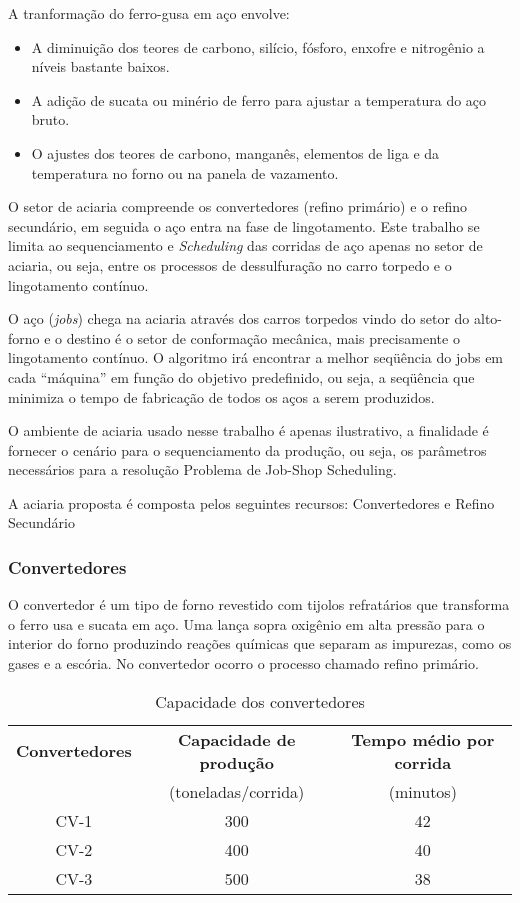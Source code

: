 A tranformação do ferro-gusa em aço envolve:
\begin{itemize}
\item A diminuição dos teores de carbono, silício, fósforo, enxofre e nitrogênio a níveis bastante baixos.
\item A adição de sucata ou minério de ferro para ajustar a temperatura do aço bruto.
\item O ajustes dos teores de carbono, manganês, elementos de liga e da temperatura no forno ou na panela de vazamento.
\end{itemize}

O setor de aciaria compreende os convertedores (refino primário) e o refino secundário, em seguida o aço entra na fase de lingotamento. Este trabalho se limita ao sequenciamento e {\it Scheduling} das corridas de aço apenas no setor de aciaria, ou seja, entre os processos de dessulfuração no carro torpedo e o lingotamento contínuo.

O aço ({\it jobs}) chega na aciaria através dos carros torpedos vindo do setor do alto-forno e o destino é o setor de conformação mecânica, mais precisamente o lingotamento contínuo. O algoritmo irá encontrar a melhor seqüência do jobs em cada “máquina” em função do objetivo predefinido, ou seja, a seqüência que minimiza o tempo de fabricação de
todos os aços a serem produzidos.

O ambiente de aciaria usado nesse trabalho é apenas ilustrativo, a finalidade é fornecer o cenário para o sequenciamento da produção, ou seja, os parâmetros necessários para a resolução Problema de Job-Shop Scheduling.

A aciaria proposta é composta pelos seguintes recursos: Convertedores e Refino Secundário

\subsubsection{Convertedores}
O convertedor é um tipo de forno revestido com tijolos refratários que transforma o ferro usa e sucata em aço. Uma lança sopra oxigênio em alta pressão para o interior do forno produzindo reações químicas que separam as impurezas, como os gases e a escória. No convertedor ocorro o processo chamado refino primário.

\begin{table}[H]
\begin{center}
  \begin{tabular}{|c|c|c|}
    \hline
    {\bf Convertedores} & {\bf Capacidade de produção} & {\bf Tempo médio por corrida} \\
    $\quad$ & (toneladas/corrida)        &    (minutos) \\ \hline
    CV-1 & 300 & 42 \\ \hline
    CV-2 & 400 & 40 \\ \hline
    CV-3 & 500 & 38 \\
    \hline
  \end{tabular}
\end{center}
\caption{Capacidade dos convertedores}
\end{table}

